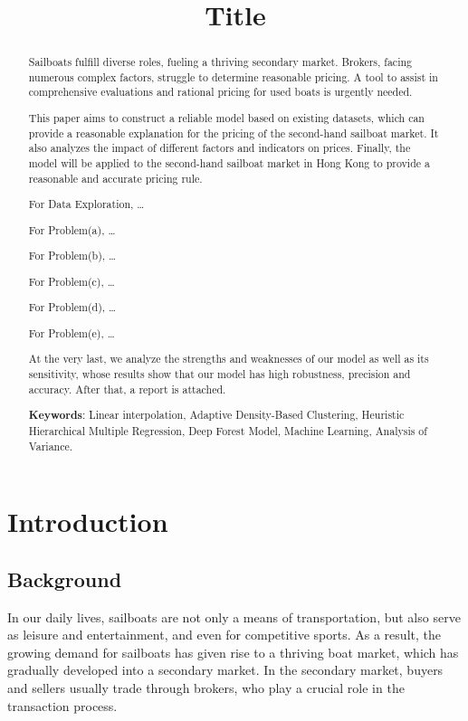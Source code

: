\documentclass[12pt]{article}  %
\title{Title}  %
\begin{document}
\begin{abstract}
    Sailboats fulfill diverse roles, fueling a thriving secondary market. 
    Brokers, facing numerous complex factors, struggle to determine reasonable pricing. 
    A tool to assist in comprehensive evaluations and rational pricing for used boats is urgently needed.
    
    This paper aims to construct a reliable model based on existing datasets, 
    which can provide a reasonable explanation for the pricing of the second-hand sailboat market. 
    It also analyzes the impact of different factors and indicators on prices. 
    Finally, the model will be applied to the second-hand sailboat market in Hong Kong to provide a reasonable and accurate pricing rule.

    For Data Exploration, \dots

    For Problem(a), \dots

    For Problem(b), \dots

    For Problem(c), \dots

    For Problem(d), \dots

    For Problem(e), \dots

    At the very last, we analyze the strengths and weaknesses of our model as well as its
sensitivity, whose results show that our model has high robustness, precision and accuracy.
After that, a report is attached.




    \vspace{5pt}
    \textbf{Keywords}:  Linear interpolation, Adaptive Density-Based Clustering, Heuristic Hierarchical Multiple Regression, Deep Forest Model,  Machine Learning, Analysis of Variance.
 

\end{abstract}

\maketitle  %
\tableofcontents  %


\section{Introduction}
\subsection{Background}
In our daily lives, sailboats are not only a means of transportation, but also serve as leisure and entertainment, and even for competitive sports. As a result, the growing demand for sailboats has given rise to a thriving boat market, which has gradually developed into a secondary market. In the secondary market, buyers and sellers usually trade through brokers, who play a crucial role in the transaction process.
\end{document}
